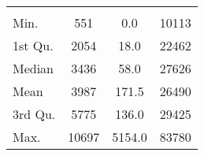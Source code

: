 \begin{tabular}{lS[table-format=5.1]S[table-format=5.1]S[table-format=5.1]}
&  &  &  \\
 Min.    & 551 & 0.0 & 10113 \\
 1st Qu. & 2054 & 18.0 & 22462 \\
 Median  & 3436 & 58.0 & 27626 \\
 Mean    & 3987 & 171.5 & 26490 \\
 3rd Qu. & 5775 & 136.0 & 29425 \\
 Max.    & 10697 & 5154.0 & 83780 \\
\end{tabular}
